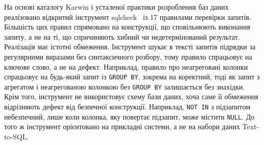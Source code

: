 \documentclass[a4paper,14pt,oneside]{extreport}
\begin{document}
На основі каталогу Karwin і усталеної практики розроблення баз даних реалізовано відкритий інструмент sqlcheck~\cite{sqlcheckRepo} із 17 правилами перевірки запитів. Більшість цих правил спрямовано на конструкції, що сповільнюють виконання запиту, а не на ті, що спричиняють хибний чи недетермінований результат. Реалізація має істотні обмеження. Інструмент шукає в тексті запитів підрядки за регулярними виразами без синтаксичного розбору, тому правило спрацьовує на ключове слово, а не на дефект. Наприклад, правило про неагреговані колонки спрацьовує на будь-який запит із \texttt{GROUP~BY}, зокрема на коректний, тоді як запит з агрегатом і неагрегованою колонкою без \texttt{GROUP~BY} залишається без знахідки. Крім того, інструмент не використовує схему бази даних, хоча саме її обмеження відрізняють дефект від безпечної конструкції. Наприклад, \texttt{NOT~IN} з підзапитом небезпечний, лише коли колонка, яку повертає підзапит, може містити \texttt{NULL}. До того ж інструмент орієнтовано на прикладні системи, а не на набори даних Text-to-SQL.
\end{document}
